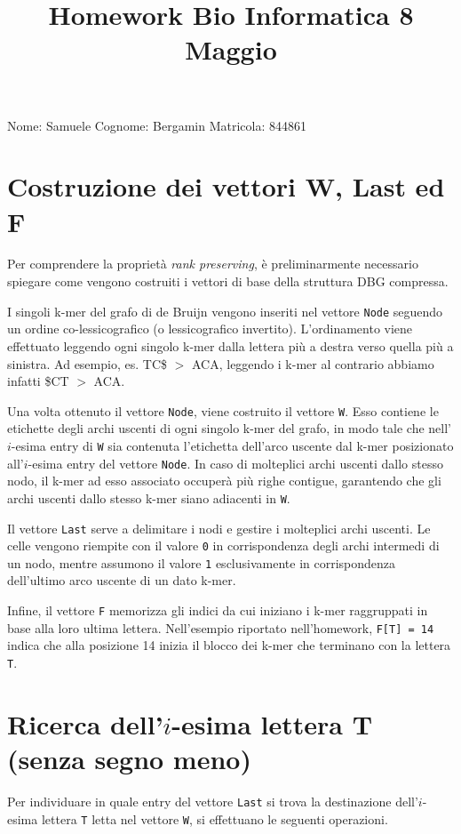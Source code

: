 \documentclass[a4paper,11pt]{article}
\begin{document}
\title{Homework Bio Informatica 8 Maggio}
\date{}
\maketitle


Nome: Samuele
Cognome: Bergamin
Matricola: 844861

\section{Costruzione dei vettori W, Last ed F}
Per comprendere la proprietà \textit{rank preserving}, è preliminarmente necessario spiegare come vengono costruiti i vettori di base della struttura DBG compressa.

I singoli k-mer del grafo di de Bruijn vengono inseriti nel vettore \texttt{Node} seguendo un ordine co-lessicografico (o lessicografico invertito). L'ordinamento viene effettuato leggendo ogni singolo k-mer dalla lettera più a destra verso quella più a sinistra. Ad esempio, es. TC\$ $>$ ACA, leggendo i k-mer al contrario abbiamo infatti \$CT $>$ ACA.

Una volta ottenuto il vettore \texttt{Node}, viene costruito il vettore \texttt{W}. Esso contiene le etichette degli archi uscenti di ogni singolo k-mer del grafo, in modo tale che nell'$i$-esima entry di \texttt{W} sia contenuta l'etichetta dell'arco uscente dal k-mer posizionato all'$i$-esima entry del vettore \texttt{Node}. In caso di molteplici archi uscenti dallo stesso nodo, il k-mer ad esso associato occuperà più righe contigue, garantendo che gli archi uscenti dallo stesso k-mer siano adiacenti in \texttt{W}.

Il vettore \texttt{Last} serve a delimitare i nodi e gestire i molteplici archi uscenti. Le celle vengono riempite con il valore \texttt{0} in corrispondenza degli archi intermedi di un nodo, mentre assumono il valore \texttt{1} esclusivamente in corrispondenza dell'ultimo arco uscente di un dato k-mer.

Infine, il vettore \texttt{F} memorizza gli indici da cui iniziano i k-mer raggruppati in base alla loro ultima lettera. Nell'esempio riportato nell'homework, \texttt{F[T] = 14} indica che alla posizione 14 inizia il blocco dei k-mer che terminano con la lettera \texttt{T}.

\section{Ricerca dell'$i$-esima lettera T (senza segno meno)}
Per individuare in quale entry del vettore \texttt{Last} si trova la destinazione dell'$i$-esima lettera \texttt{T} letta nel vettore \texttt{W}, si effettuano le seguenti operazioni.
\end{document}
